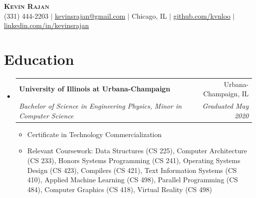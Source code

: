 \documentclass[letterpaper,11pt]{article}
\makeatletter
\newcommand{\resumeItem}[1]{\item\small{#1 \vspace{-2pt}}}
\newcommand{\resumeSubheading}[4]{%
  \vspace{-2pt}\item
    \begin{tabular*}{0.97\textwidth}[t]{l@{\extracolsep{\fill}}r}
      \textbf{#1} & #2 \\
      \textit{\small#3} & \textit{\small #4} \\
    \end{tabular*}\vspace{-7pt}
}
\newcommand{\resumeSubHeadingListStart}{\begin{itemize}[leftmargin=0.15in, label={}]}
\newcommand{\resumeSubHeadingListEnd}{\end{itemize}}
\newcommand{\resumeItemListStart}{\begin{itemize}}
\newcommand{\resumeItemListEnd}{\end{itemize}\vspace{-5pt}}
\makeatother
\begin{document}
\begin{center}
    \textbf{\Huge \scshape Kevin Rajan} \\ \vspace{1pt}
    \small (331) 444-2203 $|$
    \href{mailto:kevinsrajan@gmail.com}{\underline{kevinsrajan@gmail.com}} $|$
    Chicago, IL $|$
    \href{https://github.com/kvnloo}{\underline{github.com/kvnloo}} $|$
    \href{https://linkedin.com/in/kevinsrajan}{\underline{linkedin.com/in/kevinsrajan}}
\end{center}

\section{Education}
  \resumeSubHeadingListStart
    \resumeSubheading
      {University of Illinois at Urbana-Champaign}{Urbana-Champaign, IL}
      {Bachelor of Science in Engineering Physics, Minor in Computer Science}{Graduated May 2020}
      \resumeItemListStart
        \resumeItem{Certificate in Technology Commercialization}
        \resumeItem{Relevant Coursework: Data Structures (CS 225), Computer Architecture (CS 233), Honors Systems Programming (CS 241), Operating Systems Design (CS 423), Compilers (CS 421), Text Information Systems (CS 410), Applied Machine Learning (CS 498), Parallel Programming (CS 484), Computer Graphics (CS 418), Virtual Reality (CS 498)}
      \resumeItemListEnd
  \resumeSubHeadingListEnd
\end{document}
